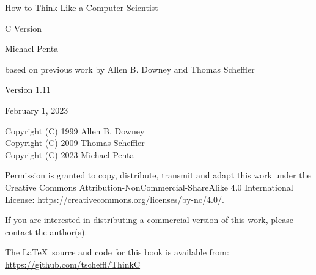 \documentclass[a4paper]{book}
\begin{document}
\thispagestyle{empty}

\begin{flushright}
\vspace*{2.5in}

{\huge How to Think Like a Computer Scientist}

\vspace{0.25in}

{\LARGE C Version}

\vspace{1in}

{\Large Michael Penta}

{based on previous work by Allen B. Downey and Thomas Scheffler}

\vspace{1in}

{\Large Version 1.11}

{\small February 1, 2023}
\vfill

\end{flushright}



Copyright (C) 1999  Allen B. Downey\\
Copyright (C) 2009  Thomas Scheffler\\
Copyright (C) 2023 Michael Penta\\

\vspace{0.25in}

Permission is granted to copy, distribute, transmit and adapt this
work under the Creative Commons Attribution-NonCommercial-ShareAlike 4.0
International License: \url{https://creativecommons.org/licenses/by-nc/4.0/}.

If you are interested in distributing a commercial version of this
work, please contact the author(s).

The \LaTeX\ source and code for this book is available from: \\
\url{https://github.com/tscheffl/ThinkC}

\frontmatter
\tableofcontents


\mainmatter












\appendix



\printindex

\end{document}
